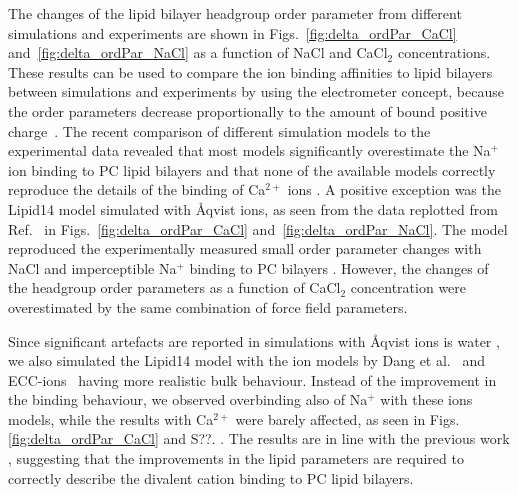 \documentclass[aip,jcp,twocolumn]{revtex4}
\begin{document}
The changes of the lipid bilayer headgroup order parameter from different simulations and
experiments \cite{akutsu81,altenbach84} are shown in Figs.~\ref{fig:delta_ordPar_CaCl} and~\ref{fig:delta_ordPar_NaCl}
as a function of NaCl and CaCl$_2$ concentrations.
These results can be used to compare the ion binding affinities to lipid bilayers
between simulations and experiments by using the electrometer concept, because 
the order parameters decrease proportionally to the amount of bound positive charge~\cite{seelig87,catte16}. 
The recent comparison of different simulation models to the experimental data
revealed that most models significantly overestimate the Na$^+$ ion binding to PC
lipid bilayers and that none of the available models correctly reproduce
the details of the binding of Ca$^{2+}$ ions \cite{catte16}.
A positive exception was the Lipid14 model \cite{dickson14} simulated with \AA{}qvist ions,
as seen from the data replotted from Ref.~ in Figs.~\ref{fig:delta_ordPar_CaCl} and~\ref{fig:delta_ordPar_NaCl}.
The model reproduced the experimentally measured small order parameter changes with NaCl
and imperceptible Na$^+$ binding to PC bilayers \cite{akutsu81,altenbach84}.
However, the changes of the headgroup order parameters as a function of CaCl$_2$ 
concentration were overestimated by the same combination of force field parameters.

Since significant artefacts are reported in simulations with \AA{}qvist ions is water \cite{??} ,
we also simulated the Lipid14 model with the ion models by Dang et al.~\cite{smith94,chang1999,dang2006} and
ECC-ions~\cite{jungwirth17-new-paper-to-be-published, kohagen16, Pluharova2014} having
more realistic bulk behaviour. Instead of the improvement in the binding behaviour,
we observed overbinding also of Na$^+$ with these ions models, while the results
with Ca$^{2+}$ were barely affected,
as seen in Figs. \ref{fig:delta_ordPar_CaCl} and S??.%
.
The results are in line with the previous work \cite{catte16},
suggesting that the improvements in the lipid parameters are
required to correctly describe the divalent cation binding to PC lipid bilayers.
\end{document}
